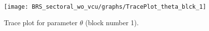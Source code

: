 \begin{figure}[H]
\centering
  \texttt{[image: BRS\_sectoral\_wo\_vcu/graphs/TracePlot\_theta\_blck\_1]}\\
    \caption{Trace plot for parameter ${\theta}$ (block number 1).}
\end{figure}
